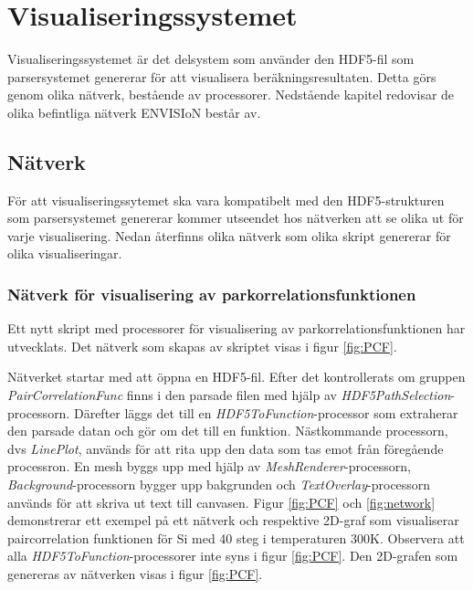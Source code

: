 \section{Visualiseringssystemet}
Visualiseringssystemet är det delsystem som använder den HDF5-fil som parsersystemet genererar för att visualisera beräkningsresultaten. Detta görs genom olika nätverk, bestående av processorer. Nedstående kapitel redovisar de olika befintliga nätverk ENVISIoN består av. 

\subsection{Nätverk}
För att visualiseringssytemet ska vara kompatibelt med den HDF5-strukturen som parsersystemet genererar kommer utseendet hos nätverken att se olika ut för varje visualisering. Nedan återfinns olika nätverk som olika skript genererar för olika visualiseringar.

\subsubsection{Nätverk för visualisering av parkorrelationsfunktionen}

Ett nytt skript med processorer för visualisering av parkorrelationsfunktionen har utvecklats. Det nätverk som skapas av skriptet visas i figur \ref{fig:PCF}. 
 

Nätverket startar med att öppna en HDF5-fil. Efter det kontrollerats om gruppen \textit{PairCorrelationFunc} finns i den parsade filen med hjälp av \textit{HDF5PathSelection}-processorn. Därefter läggs det till en \textit{HDF5ToFunction}-processor som extraherar den parsade datan och gör om det till en funktion. Nästkommande processorn, dvs \textit{LinePlot}, används för att
rita upp den data som tas emot från föregående processron. En mesh byggs upp med hjälp av \textit{MeshRenderer}-processorn, \textit{Background}-processorn bygger upp bakgrunden och \textit{TextOverlay}-processorn används för att skriva ut text till canvasen. 
\newpage
Figur \ref{fig:PCF} och \ref{fig:network} demonstrerar ett exempel på ett nätverk och respektive 2D-graf som visualiserar paircorrelation funktionen för Si med 40 steg i temperaturen 300K. Observera att alla \textit{HDF5ToFunction}-processorer inte syns i figur \ref{fig:PCF}. Den 2D-grafen som genereras av nätverken visas i figur \ref{fig:PCF}. 

